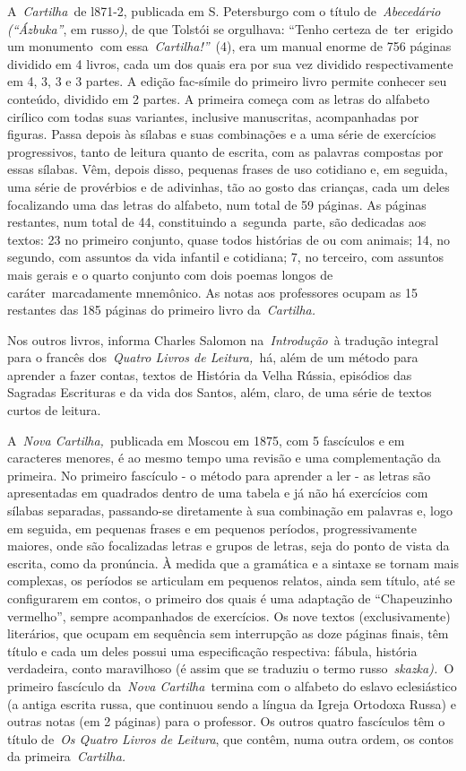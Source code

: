 A~\emph{Cartilha~}de l871-2, publicada em S. Petersburgo com o título
de~\emph{Abecedário (``Ázbuka''}, em russo\emph{)}, de que Tolstói se
orgulhava: ``Tenho certeza de~ter~erigido um monumento\textbf{~}com
essa~\emph{Cartilha!''}~(4), era um manual enorme de 756 páginas
dividido em 4 livros, cada um dos quais era por sua vez dividido
respectivamente em 4, 3, 3 e 3 partes. A edição fac-símile do primeiro
livro permite conhecer seu conteúdo, dividido em 2 partes. A primeira
começa com as letras do alfabeto cirílico com todas suas variantes,
inclusive manuscritas, acompanhadas por figuras. Passa depois às sílabas
e suas combinações e a uma série de exercícios progressivos, tanto de
leitura quanto de escrita, com as palavras compostas por essas sílabas.
Vêm, depois disso, pequenas frases de uso cotidiano e, em seguida, uma
série de provérbios e de adivinhas, tão ao gosto das crianças, cada um
deles focalizando uma das letras do alfabeto, num total de 59 páginas.
As páginas restantes, num total de 44, constituindo a~segunda~parte, são
dedicadas aos textos: 23 no primeiro conjunto, quase todos histórias de
ou com animais; 14, no segundo, com assuntos da vida infantil e
cotidiana; 7, no terceiro, com assuntos mais gerais e o quarto conjunto
com dois poemas longos de caráter~marcadamente mnemônico. As notas aos
professores ocupam as 15 restantes das 185 páginas do primeiro livro
da~\emph{Cartilha.}

Nos outros livros, informa Charles Salomon na\emph{~Introdução}~à
tradução integral para o francês dos~\emph{Quatro Livros de
Leitura,~}há, além de um método para aprender a fazer contas, textos de
História da Velha Rússia, episódios das Sagradas Escrituras e da vida
dos Santos, além, claro, de uma série de textos curtos de leitura.

A~\emph{Nova Cartilha,~}publicada em Moscou em 1875, com 5 fascículos e
em caracteres menores, é ao mesmo tempo uma revisão e uma complementação
da primeira. No primeiro fascículo - o método para aprender a ler - as
letras são apresentadas em quadrados dentro de uma tabela e já não há
exercícios com sílabas separadas, passando-se diretamente à sua
combinação em palavras e, logo em seguida, em pequenas frases e em
pequenos períodos, progressivamente maiores, onde são focalizadas letras
e grupos de letras, seja do ponto de vista da escrita, como da
pronúncia. À medida que a gramática e a sintaxe se tornam mais
complexas, os períodos se articulam em pequenos relatos, ainda sem
título, até se configurarem em contos, o primeiro dos quais é uma
adaptação de ``Chapeuzinho vermelho'', sempre acompanhados de
exercícios. Os nove textos (exclusivamente) literários, que ocupam em
sequência sem interrupção as doze páginas finais, têm título e cada um
deles possui uma especificação respectiva: fábula, história verdadeira,
conto maravilhoso (é assim que se traduziu o termo
russo~\emph{skazka).~}O primeiro fascículo da~\emph{Nova
Cartilha}~termina com o alfabeto do eslavo eclesiástico (a antiga
escrita russa, que continuou sendo a língua da Igreja Ortodoxa Russa) e
outras notas (em 2 páginas) para o professor. Os outros quatro
fascículos têm o título de~\emph{Os Quatro Livros de Leitura}, que
contêm, numa outra ordem, os contos da primeira~\emph{Cartilha.}

